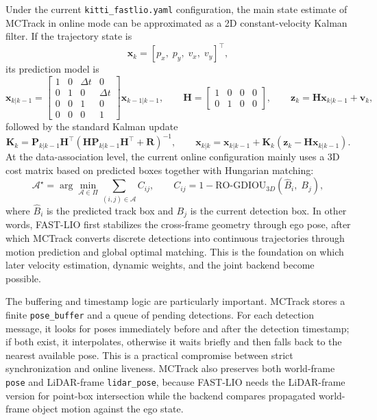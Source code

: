 \documentclass[a4paper,12pt]{article}
\begin{document}
Under the current \texttt{kitti\_fastlio.yaml} configuration, the main state estimate of MCTrack in online mode can be approximated as a 2D constant-velocity Kalman filter. If the trajectory state is
\begin{equation}
\mathbf{x}_k=[p_x,\; p_y,\; v_x,\; v_y]^\top,
\end{equation}
its prediction model is
\begin{equation}
\mathbf{x}_{k|k-1}=
\begin{bmatrix}
1 & 0 & \Delta t & 0\\
0 & 1 & 0 & \Delta t\\
0 & 0 & 1 & 0\\
0 & 0 & 0 & 1
\end{bmatrix}
\mathbf{x}_{k-1|k-1},
\qquad
\mathbf{H}=
\begin{bmatrix}
1 & 0 & 0 & 0\\
0 & 1 & 0 & 0
\end{bmatrix},
\qquad
\mathbf{z}_k=\mathbf{H}\mathbf{x}_{k|k-1}+\mathbf{v}_k,
\end{equation}
followed by the standard Kalman update
\begin{equation}
\mathbf{K}_k=\mathbf{P}_{k|k-1}\mathbf{H}^\top(\mathbf{H}\mathbf{P}_{k|k-1}\mathbf{H}^\top+\mathbf{R})^{-1},
\qquad
\mathbf{x}_{k|k}=\mathbf{x}_{k|k-1}+\mathbf{K}_k(\mathbf{z}_k-\mathbf{H}\mathbf{x}_{k|k-1}).
\end{equation}
At the data-association level, the current online configuration mainly uses a 3D cost matrix based on predicted boxes together with Hungarian matching:
\begin{equation}
\mathcal{A}^{\star}
=
\arg\min_{\mathcal{A}\in\Pi}
\sum_{(i,j)\in\mathcal{A}} C_{ij},
\qquad
C_{ij}=1-\mathrm{RO\mbox{-}GDIOU}_{3D}\!\left(\hat{B}_i,\; B_j\right),
\end{equation}
where \(\hat{B}_i\) is the predicted track box and \(B_j\) is the current detection box. In other words, FAST-LIO first stabilizes the cross-frame geometry through ego pose, after which MCTrack converts discrete detections into continuous trajectories through motion prediction and global optimal matching. This is the foundation on which later velocity estimation, dynamic weights, and the joint backend become possible.

The buffering and timestamp logic are particularly important. MCTrack stores a finite \texttt{pose\_buffer} and a queue of pending detections. For each detection message, it looks for poses immediately before and after the detection timestamp; if both exist, it interpolates, otherwise it waits briefly and then falls back to the nearest available pose. This is a practical compromise between strict synchronization and online liveness. MCTrack also preserves both world-frame \texttt{pose} and LiDAR-frame \texttt{lidar\_pose}, because FAST-LIO needs the LiDAR-frame version for point-box intersection while the backend compares propagated world-frame object motion against the ego state.
\end{document}

